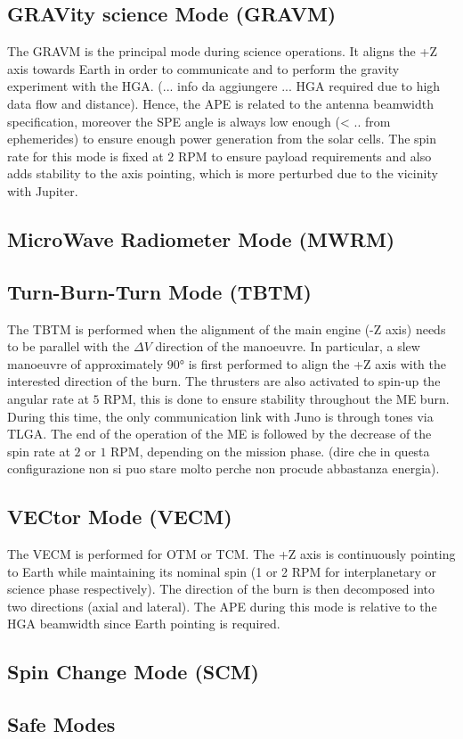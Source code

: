 \subsection{GRAVity science Mode (GRAVM)}
\label{subsec:grav_mode}

The GRAVM is the principal mode during science operations. It aligns the +Z axis towards Earth in order to communicate and to perform the gravity experiment with the HGA. (... info da aggiungere ...  HGA required due to high data flow and distance). Hence, the APE is related to the antenna beamwidth specification, moreover the SPE angle is always low enough (< .. from ephemerides) to ensure enough power generation from the solar cells. 
The spin rate for this mode is fixed at $2$ RPM to ensure payload requirements and also adds stability to the axis pointing, which is more perturbed due to the vicinity with Jupiter. 

\subsection{MicroWave Radiometer Mode (MWRM)}
\label{subsec:mwr_mode}

\subsection{Turn-Burn-Turn Mode (TBTM)}
\label{subsec:tbt_mode}

The TBTM is performed when the alignment of the main engine (-Z axis) needs to be parallel with the $\Delta V$ direction of the manoeuvre. In particular, a slew manoeuvre of approximately $90$° is first performed to align the +Z axis with the interested direction of the burn. The thrusters are also activated to spin-up the angular rate at $5$ RPM, this is done to ensure stability throughout the ME burn. During this time, the only communication link with Juno is through tones via TLGA. The end of the operation of the ME is followed by the decrease of the spin rate at $2$ or $1$ RPM, depending on the mission phase. (dire che in questa configurazione non si puo stare molto perche non procude abbastanza energia).

\subsection{VECtor Mode (VECM)}
\label{subsec:vec_mode}

The VECM is performed for OTM or TCM. The +Z axis is continuously pointing to Earth while maintaining its nominal spin (1 or 2 RPM for interplanetary or science phase respectively). The direction of the burn is then decomposed into two directions (axial and lateral). The APE during this mode is relative to the HGA beamwidth since Earth pointing is required. 

\subsection{Spin Change Mode (SCM)}
\label{subsec:spin_change_mode}

\subsection{Safe Modes}
\label{subsec:safe_modes}